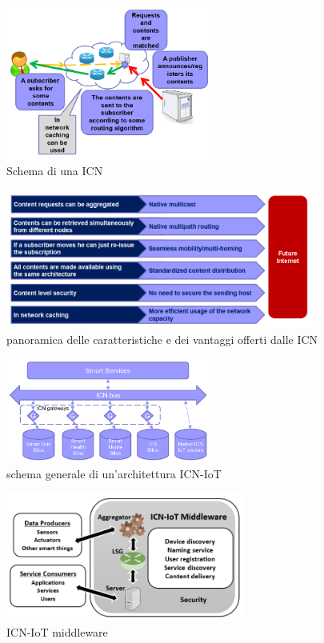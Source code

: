 	\begin{figure}
		\centering
		\includegraphics[width=0.6\textwidth]{lez8/ICNdisegno.png}
		\caption{Schema di una ICN}
		\label{fig:ICNdisegno}
	\end{figure}

	\begin{figure}
		\centering
		\includegraphics[width=0.9\textwidth]{lez8/futureInternet.png}
		\caption{panoramica delle caratteristiche e dei vantaggi offerti dalle ICN}
		\label{fig:panoramicaICN}
	\end{figure}

	\begin{figure}
		\centering
		\includegraphics[width=0.6\textwidth]{lez8/ICN-iot-bigPicture.png}
		\caption{schema generale di un'architettura ICN-IoT}
		\label{fig:ICN-bigPicture}
	\end{figure}

	\begin{figure}
		\centering
		\includegraphics[width=0.7\textwidth]{lez8/ICN-iot-middleware.png}
		\caption{ICN-IoT middleware}
		\label{fig:ICN-middleware}
	\end{figure}


	